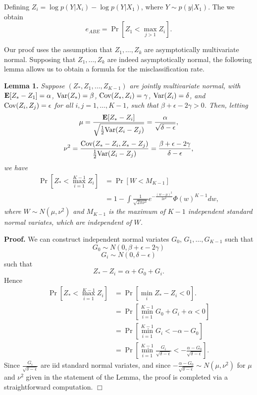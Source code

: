 \documentclass[12pt]{article}
\begin{document}
Defining $Z_i = \log p(Y|X_i) - \log p(Y|X_1)$, where $Y \sim p(y|X_1)$.
The we obtain
\[
e_{ABE} = \Pr[Z_1 < \max_{j > 1} Z_i].
\]

Our proof uses the assumption that $Z_1,\hdots, Z_k$ are asymptotically multivariate normal.
Supposing that $Z_1,\hdots, Z_k$ are indeed asymptotically normal, the following lemma
allows us to obtain a formula for the misclassification rate.

\textbf{Lemma 1. }
\emph{
Suppose $(Z_*, Z_1, \hdots, Z_{K-1})$ are jointly multivariate normal, with 
$\textbf{E}[Z_* - Z_1]= \alpha$, 
$\text{Var}(Z_*) = \beta$, 
$\text{Cov}(Z_*, Z_i) = \gamma$, 
$\text{Var}(Z_i)= \delta$, and $\text{Cov}(Z_i, Z_j) = \epsilon$ for all $i, j = 1, \hdots,
K-1$, such that $\beta + \epsilon - 2\gamma > 0$.  Then, letting
\[
\mu = \frac{\textbf{E}[Z_* - Z_i]}{\sqrt{\frac{1}{2}\text{Var}(Z_i - Z_j)}} = \frac{\alpha}{\sqrt{\delta - \epsilon}},
\]
\[
\nu^2 = \frac{\text{Cov}(Z_* -Z_i, Z_* - Z_j)}{\frac{1}{2}\text{Var}(Z_i - Z_j)} = \frac{\beta + \epsilon - 2\gamma}{\delta - \epsilon},
\]
we have
\begin{align*}
\Pr[Z_* < \max_{i=1}^{K-1} Z_i] &= \Pr[W < M_{K-1}]
\\&= 1 - \int \frac{1}{\sqrt{2\pi\nu^2}} e^{-\frac{(w-\mu)^2}{2\nu^2}} \Phi(w)^{K-1} dw,
\end{align*}
where $W \sim N(\mu, \nu^2)$ and $M_{K-1}$ is the maximum of $K-1$
independent standard normal variates, which are independent of $W$.
}

\textbf{Proof.}
We can construct independent normal variates $G_0$, $G_1,\hdots, G_{K-1}$
such that
\[
G_0 \sim N(0, \beta + \epsilon - 2 \gamma)
\]
\[
G_i \sim N(0, \delta - \epsilon)
\]
such that
\[
Z_* - Z_i = \alpha + G_0 + G_i.
\]
Hence
\begin{align*}
\Pr[Z_* < \max_{i=1}^{K-1} Z_i] &= \Pr[\min_i Z_* - Z_i < 0].
\\&= \Pr[\min_{i=1}^{K-1} G_0 + G_i + \alpha < 0]
\\&= \Pr[\min_{i=1}^{K-1} G_i < -\alpha - G_0]
\\&= \Pr[\min_{i=1}^{K-1} \frac{G_i}{\sqrt{\delta - \epsilon}} < -\frac{\alpha - G_0}{\sqrt{\delta - \epsilon}}].
\end{align*}
Since $\frac{G_i}{\sqrt{\delta - \epsilon}}$ are iid standard normal variates, and since
$-\frac{\alpha - G_0}{\sqrt{\delta - \epsilon}} \sim N(\mu,\nu^2)$ for $\mu$ and $\nu^2$ given in the statement of the Lemma, the proof is completed via a straightforward computation.  $\Box$
\end{document}

